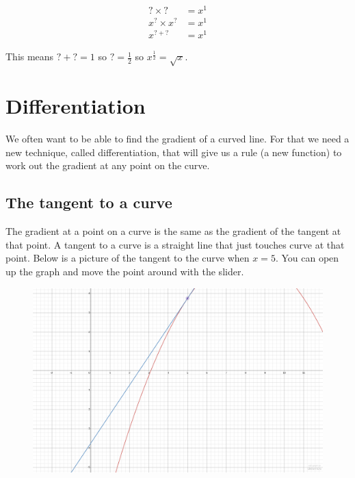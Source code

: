 \documentclass[
  a4paper,
]{scrbook}
\begin{document}
\[
\begin{aligned} ? \times ? &= x^1 \\
x^? \times x^? &= x^1 \\
x^{?+?} &= x^1
\end{aligned}
\]

This means \(? + ? = 1\) so \(?=\frac{1}{2}\) so
\(x^{\frac{1}{2}} = \sqrt{x}\).


\hypertarget{differentiation}{%
\chapter{Differentiation}\label{differentiation}}

We often want to be able to find the gradient of a curved line. For that
we need a new technique, called differentiation, that will give us a
rule (a new function) to work out the gradient at any point on the
curve.

\hypertarget{the-tangent-to-a-curve}{%
\section{The tangent to a curve}\label{the-tangent-to-a-curve}}

The gradient at a point on a curve is the same as the gradient of the
tangent at that point. A tangent to a curve is a straight line that just
touches curve at that point. Below is a picture of the tangent to the
curve when \(x=5\). You can open up the graph and move the point around
with the slider.

\begin{figure}

{\centering 

\href{https://www.desmos.com/calculator/vufqtttmvw?embed}{\includegraphics{./09-differentiation_files/figure-pdf/unnamed-chunk-1-1.png}}

}

\end{figure}
\end{document}
